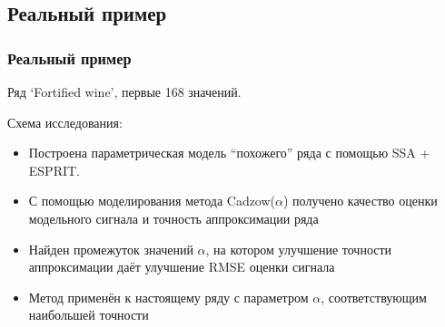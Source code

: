 \documentclass[unicode, notheorems]{beamer}
\begin{document}
\subsection{Реальный пример}
\begin{frame}
	\frametitle{Реальный пример}
    Ряд `Fortified wine', первые 168 значений.
    
    Схема исследования:
    \begin{itemize}
    	\item Построена параметрическая модель ``похожего'' ряда с помощью SSA + ESPRIT.
    	\item С помощью моделирования метода Cadzow($\alpha$) получено качество оценки модельного сигнала и точность аппроксимации ряда
    	\item Найден промежуток значений $\alpha$, на котором улучшение точности аппроксимации даёт улучшение RMSE оценки сигнала
    	\item Метод применён к настоящему ряду с параметром $\alpha$, соответствующим наибольшей точности
    \end{itemize}
\end{frame}

%	
\end{document}
